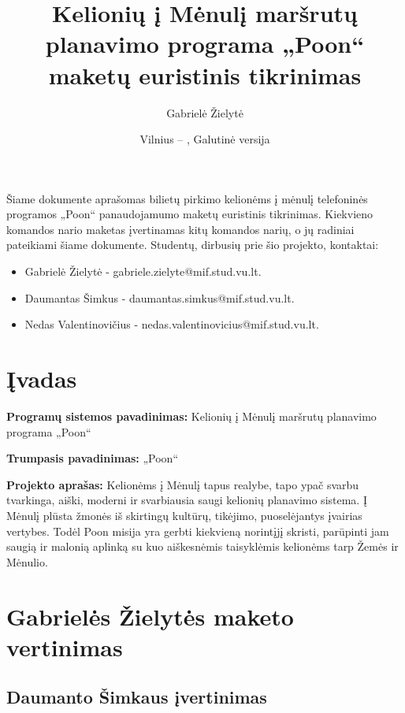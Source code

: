 \documentclass{VUMIFPSkursinis}
\title{Kelionių į Mėnulį maršrutų planavimo programa „Poon“ maketų euristinis tikrinimas}
\author{Gabrielė Žielytė}
\date{Vilnius – \the\year, Galutinė versija}
\begin{document}
	
\maketitle

\thispagestyle{empty}
\tableofcontents


Šiame dokumente aprašomas bilietų pirkimo kelionėms į mėnulį telefoninės programos „Poon“ panaudojamumo maketų euristinis tikrinimas. Kiekvieno komandos nario maketas įvertinamas kitų komandos narių, o jų radiniai pateikiami šiame dokumente. Studentų, dirbusių prie šio projekto, kontaktai:
\begin{itemize}
\item Gabrielė Žielytė - gabriele.zielyte@mif.stud.vu.lt. 
\item Daumantas Šimkus - daumantas.simkus@mif.stud.vu.lt. 
\item Nedas Valentinovičius - nedas.valentinovicius@mif.stud.vu.lt.
\end{itemize}
\thispagestyle{empty}

\cleardoublepage{}
\setcounter{page}{4}

\section{Įvadas}
\textbf{Programų sistemos pavadinimas: } Kelionių į Mėnulį maršrutų planavimo programa „Poon“
\bigskip

\textbf{Trumpasis pavadinimas: } „Poon“
\bigskip




\textbf{Projekto aprašas: } Kelionėms į Mėnulį tapus realybe, tapo ypač svarbu tvarkinga, aiški, moderni ir svarbiausia saugi kelionių planavimo sistema. Į Mėnulį plūsta žmonės iš skirtingų kultūrų, tikėjimo, puoselėjantys įvairias vertybes. Todėl Poon misija yra gerbti kiekvieną norintįjį skristi, parūpinti jam saugią ir malonią aplinką su kuo aiškesnėmis taisyklėmis kelionėms tarp Žemės ir Mėnulio.


\section{Gabrielės Žielytės maketo vertinimas}
\subsection{Daumanto Šimkaus įvertinimas}
\end{document}
